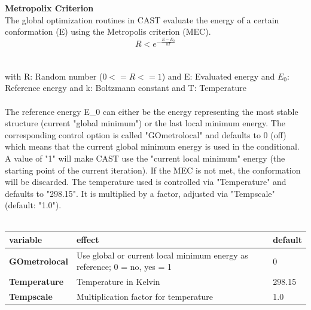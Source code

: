 \documentclass[10pt,a4paper]{article} %
\begin{document}
	\textbf{Metropolix Criterion} \\
	The global optimization routines in \ac{CAST} evaluate the energy of a certain conformation (E) using the Metropolis criterion (MEC).
	\begin{equation}
	R < e^{-\frac{E-E_0}{kT}}
	\end{equation}
	\\~\\
	with R: Random number ($0 <= R <= 1$)
	and E: Evaluated energy
	and $E_0$: Reference energy
	and k: Boltzmann constant
	and T: Temperature\\~\\

	The reference energy E_0 can either be the energy representing the most stable structure (current "global minimum") or the last local minimum energy. The corresponding control option is called "GOmetrolocal" and defaults to 0 (off) which means that the current global minimum energy is used in the conditional. A value of "1" will make \ac{CAST} use the "current local minimum" energy (the starting point of the current iteration). If the MEC is not met, the conformation will be discarded.
	The temperature used is controlled via "Temperature" and defaults to "298.15". It is multiplied by a factor, adjusted via "Tempscale" (default: "1.0").\\~\\

	\begin{tabularx}{\textwidth}{l|X|X}
		variable & effect & default\\
		\hline
		\textbf{GOmetrolocal} & Use global or current local minimum energy as reference; 0 = no, yes = 1 & 0 \\
		\textbf{Temperature} & Temperature in Kelvin & 298.15 \\
		\textbf{Tempscale} & Multiplication factor for temperature & 1.0
	\end{tabularx}

\end{document}
